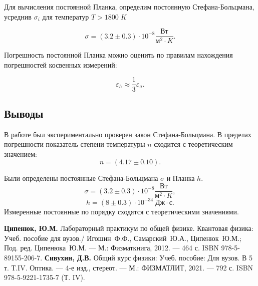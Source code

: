 \documentclass[10pt,a4paper]{article}
\begin{document}
\begin{multicols}{2}
	Для вычисления постоянной Планка, определим постоянную Стефана-Больцмана, усреднив $\sigma_i$ для температур $T > 1800\; K$
	
	$$ \sigma = (3.2 \pm 0.3) \cdot 10^{-8} \frac{\text{Вт}}{\text{м}^2 \cdot K}.$$
	
	Погрешность постоянной Планка можно оценить по правилам нахождения погрешностей косвенных измерений:
	
	$$\varepsilon_h \approx \frac{1}{3} \varepsilon_\sigma.$$

	\subsection*{Выводы}
	
	В работе был экспериментально проверен закон Стефана-Больцмана. В пределах погрешности показатель степени температуры $n$ сходится с теоретическим значением:
	$$
	n = (4.17 \pm 0.10).
	$$
	
	Были определены постоянные Стефана-Больцмана $\sigma$ и Планка $h$. 
	$$
	\sigma = (3.2 \pm 0.3) \cdot 10^{-8} \frac{\text{Вт}}{\text{м}^2 \cdot K},$$ 
	$$h = (8 \pm 0.3) \cdot 10^{-34}\; \text{Дж} \cdot \text{с}.$$
	Измеренные постоянные по порядку сходятся с теоретическими значениями.
	
	\begin{thebibliography}{}
		 \textbf{Ципенюк, Ю.М.} Лабораторный практикум по общей физике. Квантовая физика: Учеб. пособие для вузов./ Игошин~Ф.Ф., Самарский~Ю.А., Ципенюк~Ю.М.; Под. ред. Ципенюка~Ю.М. --- М.: Физматкнига, 2012. --- 464 с. ISBN 978-5-89155-206-7.
		 \textbf{Сивухин, Д.В.} Общий курс физики: Учеб. пособие: Для вузов. В 5 т. Т.IV. Оптика. --- 4-е изд., стереот. --- М.: ФИЗМАТЛИТ, 2021. --- 792 с. ISBN 978-5-9221-1735-7 (Т. IV).
	\end{thebibliography}
\end{multicols}
\end{document}
